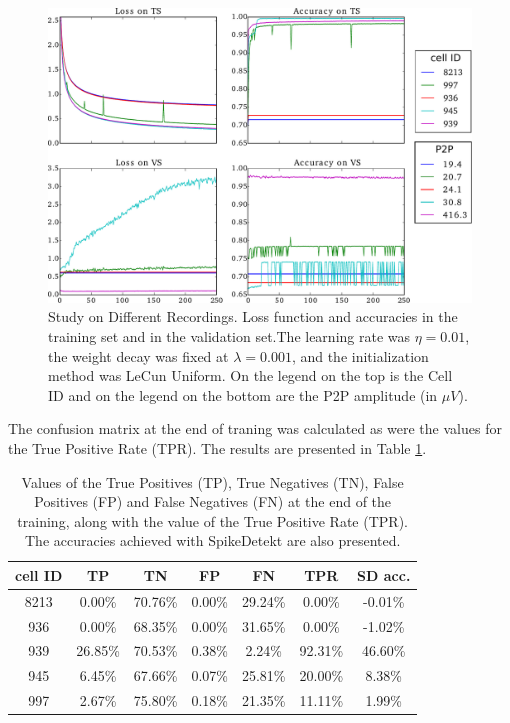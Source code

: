 \documentclass[10pt]{article}
\begin{document}
\begin{figure}[htb]
	\centering
	\includegraphics[width=\linewidth]{3.Chapter/study-on-different-cells-norm.pdf}
	\caption{Study on Different Recordings. Loss function and accuracies in the training set and in the validation set.The learning rate was $\eta = 0.01$, the weight decay was fixed at $\lambda = 0.001$, and the initialization method was LeCun Uniform. On the legend on the top is the Cell ID and on the legend on the bottom are the P2P amplitude (in $\mu V$).
}
\label{fig:study-cells}
\end{figure}

The confusion matrix at the end of traning was calculated as were the values for the True Positive Rate (TPR). The results are presented in Table \ref{table:confusion-matrix}.

\begin{table}[!htb]
\begin{center}
\begin{tabular}{c|cccc|cc}
cell ID & TP & TN & FP & FN & TPR & SD acc.\\ \hline
8213 & 0.00\% & 70.76\% & 0.00\% & 29.24\% & 0.00\% & -0.01\% \\
936 & 0.00\% & 68.35\% & 0.00\% & 31.65\% & 0.00\% & -1.02\% \\ 
939 & 26.85\% & 70.53\% & 0.38\% & 2.24\% & 92.31\% & 46.60\% \\ 
945 & 6.45\% & 67.66\% & 0.07\% & 25.81\% & 20.00\% & 8.38\% \\ 
997 & 2.67\% & 75.80\% & 0.18\% & 21.35\% & 11.11\% & 1.99\% \\ 
\end{tabular}
\end{center}
\caption{Values of the True Positives (TP), True Negatives (TN), False Positives (FP) and False Negatives (FN) at the end of the training, along with the value of the True Positive Rate (TPR). The accuracies achieved with SpikeDetekt are also presented. }
\label{table:confusion-matrix}
\end{table}
\end{document}
